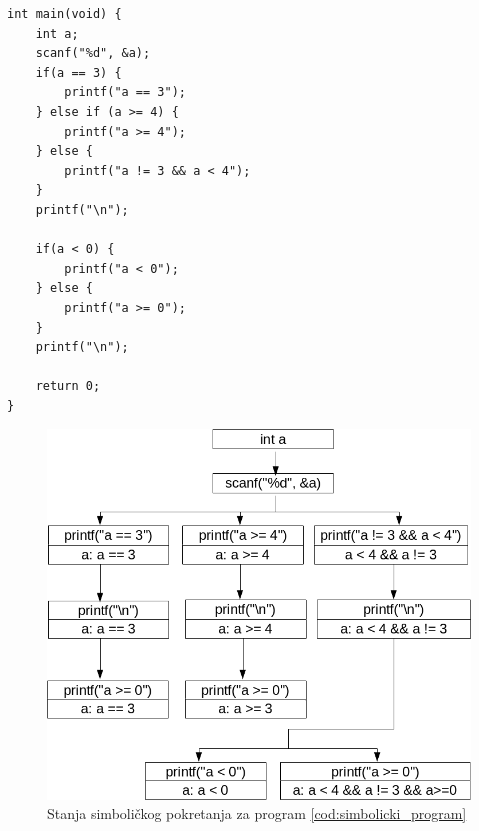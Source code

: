 \begin{lstlisting}[caption={Primjer programa nad kojim je izvršena simboličko pokretanje},label={cod:simbolicki_program}]
int main(void) {
    int a;
    scanf("%d", &a);
    if(a == 3) {
        printf("a == 3");
    } else if (a >= 4) {
        printf("a >= 4");
    } else {
        printf("a != 3 && a < 4");
    }
    printf("\n");

    if(a < 0) {
        printf("a < 0");
    } else {
        printf("a >= 0");
    }
    printf("\n");

    return 0;
}
\end{lstlisting}

\begin{figure}[htb]
    \centering
    \includegraphics[scale=0.25]{images/simbolic_skica.png}
    \caption{Stanja simboličkog pokretanja za program \ref{cod:simbolicki_program}}
    \label{fig:simbolic_skica}
\end{figure}


